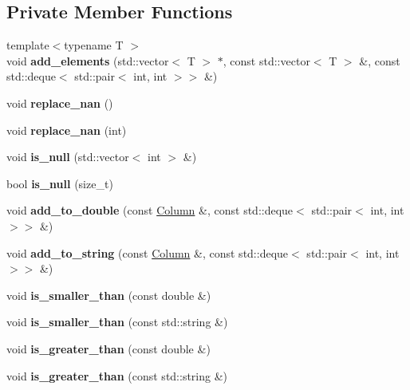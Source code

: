 \subsection*{Private Member Functions}
\begin{DoxyCompactItemize}
\item 
\mbox{\label{classColumn_a49632d8170d8289b39ace8713c467724}} 
{\footnotesize template$<$typename T $>$ }\\void {\bfseries add\+\_\+elements} (std\+::vector$<$ T $>$ $\ast$, const std\+::vector$<$ T $>$ \&, const std\+::deque$<$ std\+::pair$<$ int, int $>$$>$ \&)
\item 
\mbox{\label{classColumn_ac56702c1c3e153d9434c89a9a471d130}} 
void {\bfseries replace\+\_\+nan} ()
\item 
\mbox{\label{classColumn_ae521b1b4d6717f928dc5d778f3dd6ef1}} 
void {\bfseries replace\+\_\+nan} (int)
\item 
\mbox{\label{classColumn_aeb84b641ffe0918fc7fbbd79e71e5763}} 
void {\bfseries is\+\_\+null} (std\+::vector$<$ int $>$ \&)
\item 
\mbox{\label{classColumn_abf57b536d1d132a0f3d8841f4388bbee}} 
bool {\bfseries is\+\_\+null} (size\+\_\+t)
\item 
\mbox{\label{classColumn_adc19d61d8ec7dbea5f238c4a7013b23a}} 
void {\bfseries add\+\_\+to\+\_\+double} (const \hyperlink{classColumn}{Column} \&, const std\+::deque$<$ std\+::pair$<$ int, int $>$$>$ \&)
\item 
\mbox{\label{classColumn_a7ae5f86b705809c07375e4a30cde9b0f}} 
void {\bfseries add\+\_\+to\+\_\+string} (const \hyperlink{classColumn}{Column} \&, const std\+::deque$<$ std\+::pair$<$ int, int $>$$>$ \&)
\item 
\mbox{\label{classColumn_ad33840850da11510dea2d045214f376c}} 
void {\bfseries is\+\_\+smaller\+\_\+than} (const double \&)
\item 
\mbox{\label{classColumn_a5f693c2940b4c8158bfd5391520d7369}} 
void {\bfseries is\+\_\+smaller\+\_\+than} (const std\+::string \&)
\item 
\mbox{\label{classColumn_ae109b8fe90f79ce2a320446913ada121}} 
void {\bfseries is\+\_\+greater\+\_\+than} (const double \&)
\item 
\mbox{\label{classColumn_ae8434716fcda24ed6624735d45ff362a}} 
void {\bfseries is\+\_\+greater\+\_\+than} (const std\+::string \&)
\end{DoxyCompactItemize}
